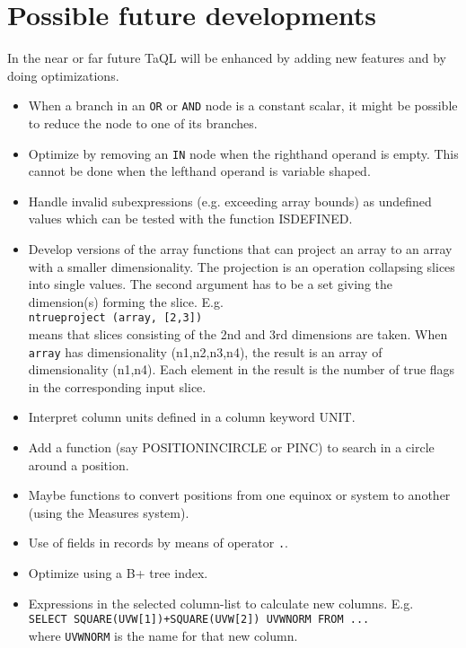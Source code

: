 \section{Possible future developments}
In the near or far future TaQL will be enhanced by adding new
features and by doing optimizations.
\begin{itemize}
  \item When a branch in an \texttt{OR} or \texttt{AND} node is a
    constant scalar, it might be possible to reduce the node to
    one of its branches.
  \item Optimize by removing an \texttt{IN} node when the righthand
    operand is empty. This cannot be done when the lefthand operand
    is variable shaped.
  \item Handle invalid subexpressions (e.g. exceeding array bounds)
    as undefined values
    which can be tested with the function ISDEFINED.
  \item Develop versions of the array functions that can project
    an array to an array with a smaller dimensionality. The projection
    is an operation collapsing slices into single values.
    The second argument has to be a set giving the
    dimension(s) forming the slice. E.g.
    \\\texttt{ntrueproject (array, [2,3])}
    \\means that slices consisting of the 2nd and 3rd dimensions are
    taken. When \texttt{array} has dimensionality (n1,n2,n3,n4), the result is
    an array of dimensionality (n1,n4). Each element in the result is
    the number of true flags in the corresponding input slice.
  \item Interpret column units defined in a column keyword UNIT.
  \item Add a function (say POSITIONINCIRCLE or PINC) to search in a circle
       around a position.
  \item Maybe functions to convert positions from one equinox or system
       to another (using the Measures system).
  \item Use of fields in records by means of operator \texttt{.}.
  \item Optimize using a B+ tree index.
  \item Expressions in the selected column-list to calculate new columns. E.g.
       \\\texttt{SELECT SQUARE(UVW[1])+SQUARE(UVW[2]) UVWNORM FROM ...}
       \\where \texttt{UVWNORM} is the name for that new column.
\end{itemize}
